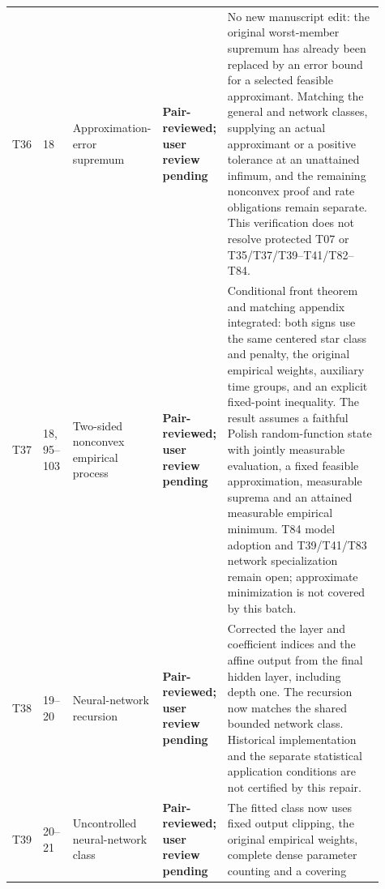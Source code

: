 \documentclass[10pt]{article}
\newcommand{\deferred}{\textcolor{deferredred}{\textbf{Deferred}}}
\newcommand{\pairreviewed}{\textcolor{deferredred}{\textbf{Pair-reviewed; user review pending}}}
\begin{document}
\begin{landscape}
\begin{longtable}{L{0.045\linewidth}L{0.08\linewidth}L{0.21\linewidth}L{0.13\linewidth}L{0.445\linewidth}}
T36 & 18 & Approximation-error supremum & \pairreviewed &
\textcolor{deferredred}{No new manuscript edit: the original worst-member
supremum has already been replaced by an error bound for a selected
feasible approximant. Matching the general and network classes, supplying
an actual approximant or a positive tolerance at an unattained infimum,
and the remaining nonconvex proof and rate obligations remain separate.
This verification does not resolve protected T07 or T35/T37/T39--T41/T82--T84.}\\
T37 & 18, 95--103 & Two-sided nonconvex empirical process & \pairreviewed &
\textcolor{deferredred}{Conditional front theorem and matching appendix integrated: both signs use the
same centered star class and penalty, the original empirical weights, auxiliary
time groups, and an explicit fixed-point inequality. The result assumes a
faithful Polish random-function state with jointly measurable evaluation, a
fixed feasible approximation, measurable suprema and an attained measurable
empirical minimum. T84 model adoption and T39/T41/T83 network specialization
remain open; approximate minimization is not covered by this batch.}\\
T38 & 19--20 & Neural-network recursion & \pairreviewed &
\textcolor{deferredred}{Corrected the layer and coefficient indices and the affine
output from the final hidden layer, including depth one. The recursion now
matches the shared bounded network class. Historical implementation and the
separate statistical application conditions are not certified by this repair.}\\
T39 & 20--21 & Uncontrolled neural-network class & \pairreviewed &
\textcolor{deferredred}{The fitted class now uses fixed output clipping, the
original empirical weights, complete dense parameter counting and a covering
}
\end{longtable}
\end{landscape}
\end{document}
